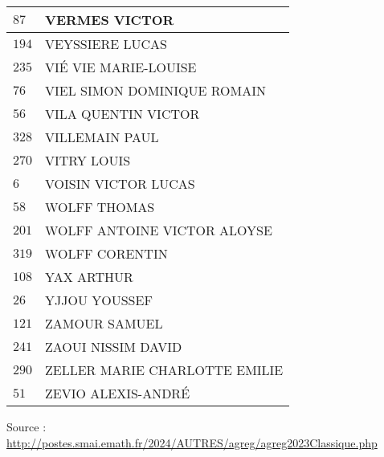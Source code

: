 \begin{xltabular}{\linewidth}{|l|X|}
    \hline
    $87$ & VERMES VICTOR \\
    \hline
    $194$ & VEYSSIERE LUCAS \\
    \hline
    $235$ & VIÉ VIE MARIE-LOUISE \\
    \hline
    $76$ & VIEL SIMON DOMINIQUE ROMAIN \\
    \hline
    $56$ & VILA QUENTIN VICTOR \\
    \hline
    $328$ & VILLEMAIN PAUL \\
    \hline
    $270$ & VITRY LOUIS \\
    \hline
    $6$ & VOISIN VICTOR LUCAS \\
    \hline
    $58$ & WOLFF THOMAS \\
    \hline
    $201$ & WOLFF ANTOINE VICTOR ALOYSE \\
    \hline
    $319$ & WOLFF CORENTIN \\
    \hline
    $108$ & YAX ARTHUR \\
    \hline
    $26$ & YJJOU YOUSSEF \\
    \hline
    $121$ & ZAMOUR SAMUEL \\
    \hline
    $241$ & ZAOUI NISSIM DAVID \\
    \hline
    $290$ & ZELLER MARIE CHARLOTTE EMILIE \\
    \hline
    $51$ & ZEVIO ALEXIS-ANDRÉ \\
    \hline
  \end{xltabular}

  \begin{flushright}
    {\tiny Source : \url{http://postes.smai.emath.fr/2024/AUTRES/agreg/agreg2023Classique.php}}
  \end{flushright}

